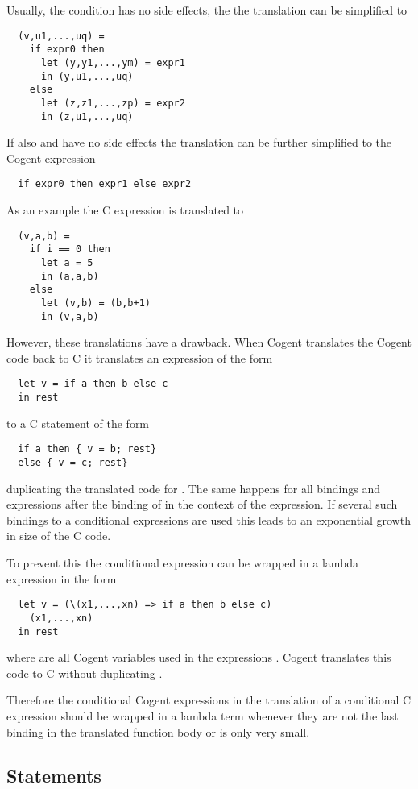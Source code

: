 Usually, the condition  has no side effects, the the translation can be simplified to
\begin{verbatim}
  (v,u1,...,uq) = 
    if expr0 then 
      let (y,y1,...,ym) = expr1 
      in (y,u1,...,uq)
    else
      let (z,z1,...,zp) = expr2
      in (z,u1,...,uq)
\end{verbatim}
If also  and  have no side effects the translation can be further simplified to
the Cogent expression
\begin{verbatim}
  if expr0 then expr1 else expr2
\end{verbatim}

As an example the C expression  is translated to
\begin{verbatim}
  (v,a,b) = 
    if i == 0 then 
      let a = 5
      in (a,a,b)
    else
      let (v,b) = (b,b+1)
      in (v,a,b)
\end{verbatim}

However, these translations have a drawback. When Cogent translates the Cogent code back to C it translates
an expression of the form
\begin{verbatim}
  let v = if a then b else c
  in rest
\end{verbatim}
to a C statement of the form
\begin{verbatim}
  if a then { v = b; rest}
  else { v = c; rest}
\end{verbatim}
duplicating the translated code for . The same happens for all bindings and expressions after
the binding of  in the context of the  expression. If several such bindings to a 
conditional expressions are used this leads to an exponential growth in size of the C code.

To prevent this the conditional expression can be wrapped in a lambda expression in the form
\begin{verbatim}
  let v = (\(x1,...,xn) => if a then b else c) 
    (x1,...,xn)
  in rest
\end{verbatim}
where  are all Cogent variables used in the expressions .
Cogent translates this code to C without duplicating .

Therefore the conditional Cogent expressions in the translation of a conditional C expression
should be wrapped in a lambda term whenever they are not the last binding in the translated 
function body or  is only very small.

\subsection{Statements}
\label{app-transfunction-stat}

